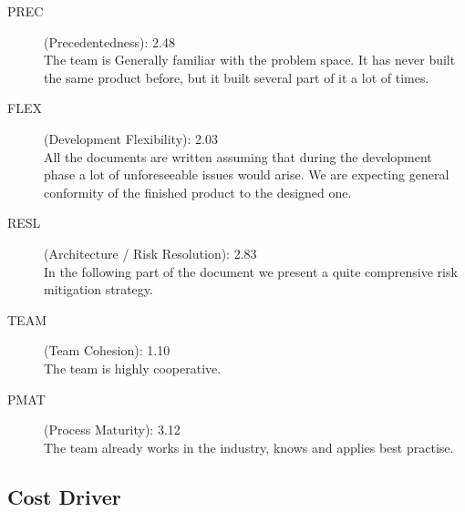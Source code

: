 \documentclass[11pt]{article} %
\begin{document}
\begin{description}
	\item[PREC] (Precedentedness):  {\large 2.48} 
\\ The team is Generally familiar with the problem space. It has never built the same product before, but it built several part of it a lot of times.
	\item[FLEX] (Development Flexibility): {\large 2.03} \\ All the documents are written assuming that during the development phase a lot of unforeseeable issues would arise. We are expecting general conformity of the finished product to the designed one.
	\item[RESL] (Architecture / Risk Resolution): {\large 2.83} \\ In the following part of the document we present a quite comprensive risk mitigation strategy. 
	\item[TEAM] (Team Cohesion): {\large 1.10} \\ The team is highly cooperative. 
	\item[PMAT] (Process Maturity): {\large 3.12} \\ The team already works in the industry, knows and applies best practise.
\end{description}

\subsection{Cost Driver}
\end{document}
